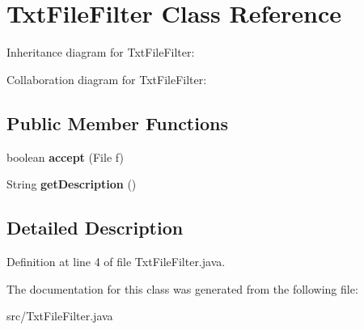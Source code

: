 \hypertarget{class_txt_file_filter}{\section{Txt\-File\-Filter Class Reference}
\label{class_txt_file_filter}
}


Inheritance diagram for Txt\-File\-Filter\-:


Collaboration diagram for Txt\-File\-Filter\-:
\subsection*{Public Member Functions}
\begin{DoxyCompactItemize}
\item 
\hypertarget{class_txt_file_filter_a64c80c6f6243b37a6bd3ca80ba2c929d}{boolean {\bfseries accept} (File f)}\label{class_txt_file_filter_a64c80c6f6243b37a6bd3ca80ba2c929d}

\item 
\hypertarget{class_txt_file_filter_a7a3381d673060728cddb1c89bbd0d750}{String {\bfseries get\-Description} ()}\label{class_txt_file_filter_a7a3381d673060728cddb1c89bbd0d750}

\end{DoxyCompactItemize}


\subsection{Detailed Description}


Definition at line 4 of file Txt\-File\-Filter.\-java.



The documentation for this class was generated from the following file\-:\begin{DoxyCompactItemize}
\item 
src/Txt\-File\-Filter.\-java\end{DoxyCompactItemize}
